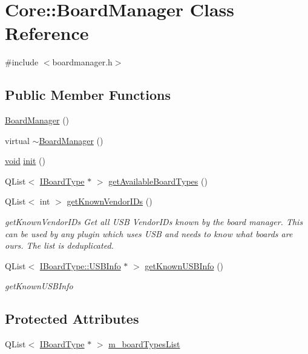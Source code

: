 \hypertarget{class_core_1_1_board_manager}{\section{\-Core\-:\-:\-Board\-Manager \-Class \-Reference}
\label{class_core_1_1_board_manager}
}


{\ttfamily \#include $<$boardmanager.\-h$>$}

\subsection*{\-Public \-Member \-Functions}
\begin{DoxyCompactItemize}
\item 
\hyperlink{group___core_plugin_ga4f2c52bc9064410a9ea3b15de6b3b172}{\-Board\-Manager} ()
\item 
virtual \hyperlink{group___core_plugin_gaceb91bd6e1ee469d9043e6295ad404fa}{$\sim$\-Board\-Manager} ()
\item 
\hyperlink{group___u_a_v_objects_plugin_ga444cf2ff3f0ecbe028adce838d373f5c}{void} \hyperlink{group___core_plugin_gabd392f7c64fd19944b464465e3ed3ecd}{init} ()
\item 
\-Q\-List$<$ \hyperlink{class_core_1_1_i_board_type}{\-I\-Board\-Type} $\ast$ $>$ \hyperlink{group___core_plugin_ga4278ca31ed4ae32d6da4c5ccd43ceb4a}{get\-Available\-Board\-Types} ()
\item 
\-Q\-List$<$ int $>$ \hyperlink{group___core_plugin_gaa37a0c8c804e3623c622cf8243bc7ef3}{get\-Known\-Vendor\-I\-Ds} ()
\begin{DoxyCompactList}\small\item\em get\-Known\-Vendor\-I\-Ds \-Get all \-U\-S\-B \-Vendor\-I\-Ds known by the board manager. \-This can be used by any plugin which uses \-U\-S\-B and needs to know what boards are ours. \-The list is deduplicated. \end{DoxyCompactList}\item 
\-Q\-List$<$ \hyperlink{struct_core_1_1_i_board_type_1_1_u_s_b_info}{\-I\-Board\-Type\-::\-U\-S\-B\-Info} $\ast$ $>$ \hyperlink{group___core_plugin_ga37e132b8ad41b05157fcd29b679ce713}{get\-Known\-U\-S\-B\-Info} ()
\begin{DoxyCompactList}\small\item\em get\-Known\-U\-S\-B\-Info \end{DoxyCompactList}\end{DoxyCompactItemize}
\subsection*{\-Protected \-Attributes}
\begin{DoxyCompactItemize}
\item 
\-Q\-List$<$ \hyperlink{class_core_1_1_i_board_type}{\-I\-Board\-Type} $\ast$ $>$ \hyperlink{group___core_plugin_ga0a7a3ac9ac181c79d4eb14940fe8bd4f}{m\-\_\-board\-Types\-List}
\end{DoxyCompactItemize}



